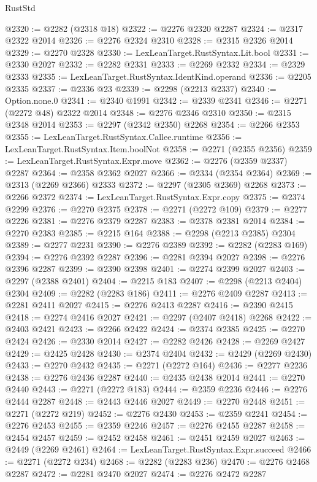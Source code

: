 \begin{lexlean}{RustStd}
\begin{coremodule}
{\begin{coremodule}
{{{{{{{{{{{{{{{{{{{{{{{{{{{{{{{{{{{{{{{{{{{{{{{{{{{{{{@2320 := @2282 (@2318 @18)
@2322 := @2276 @2320 @2287
@2324 := @2317 @2322 @2014
@2326 := @2276 @2324 @2310
@2328 := @2315 @2326 @2014
@2329 := @2270 @2328
@2330 := LexLeanTarget.RustSyntax.Lit.bool
@2331 := @2330 @2027
@2332 := @2282 @2331
@2333 := @2269 @2332
@2334 := @2329 @2333
@2335 := LexLeanTarget.RustSyntax.IdentKind.operand
@2336 := @2205 @2335
@2337 := @2336 @23
@2339 := @2298 (@2213 @2337)
@2340 := Option.none.{0}
@2341 := @2340 @1991
@2342 := @2339 @2341
@2346 := @2271 (@2272 @48) @2322 @2014
@2348 := @2276 @2346 @2310
@2350 := @2315 @2348 @2014
@2353 := @2297 (@2342 @2350) @2268
@2354 := @2266 @2353
@2355 := LexLeanTarget.RustSyntax.Callee.runtime
@2356 := LexLeanTarget.RustSyntax.Item.boolNot
@2358 := @2271 (@2355 @2356)
@2359 := LexLeanTarget.RustSyntax.Expr.move
@2362 := @2276 (@2359 @2337) @2287
@2364 := @2358 @2362 @2027
@2366 := @2334 (@2354 @2364)
@2369 := @2313 (@2269 @2366) @2333
@2372 := @2297 (@2305 @2369) @2268
@2373 := @2266 @2372
@2374 := LexLeanTarget.RustSyntax.Expr.copy
@2375 := @2374 @2299
@2376 := @2270 @2375
@2378 := @2271 (@2272 @109)
@2379 := @2277 @2226
@2381 := @2276 @2379 @2287
@2383 := @2378 @2381 @2014
@2384 := @2270 @2383
@2385 := @2215 @164
@2388 := @2298 (@2213 @2385) @2304
@2389 := @2277 @2231
@2390 := @2276 @2389
@2392 := @2282 (@2283 @169)
@2394 := @2276 @2392 @2287
@2396 := @2281 @2394 @2027
@2398 := @2276 @2396 @2287
@2399 := @2390 @2398
@2401 := @2274 @2399 @2027
@2403 := @2297 (@2388 @2401)
@2404 := @2215 @183
@2407 := @2298 (@2213 @2404) @2304
@2409 := @2282 (@2283 @186)
@2411 := @2276 @2409 @2287
@2413 := @2281 @2411 @2027
@2415 := @2276 @2413 @2287
@2416 := @2390 @2415
@2418 := @2274 @2416 @2027
@2421 := @2297 (@2407 @2418) @2268
@2422 := @2403 @2421
@2423 := @2266 @2422
@2424 := @2374 @2385
@2425 := @2270 @2424
@2426 := @2330 @2014
@2427 := @2282 @2426
@2428 := @2269 @2427
@2429 := @2425 @2428
@2430 := @2374 @2404
@2432 := @2429 (@2269 @2430)
@2433 := @2270 @2432
@2435 := @2271 (@2272 @164)
@2436 := @2277 @2236
@2438 := @2276 @2436 @2287
@2440 := @2435 @2438 @2014
@2441 := @2270 @2440
@2443 := @2271 (@2272 @183)
@2444 := @2359 @2236
@2446 := @2276 @2444 @2287
@2448 := @2443 @2446 @2027
@2449 := @2270 @2448
@2451 := @2271 (@2272 @219)
@2452 := @2276 @2430
@2453 := @2359 @2241
@2454 := @2276 @2453
@2455 := @2359 @2246
@2457 := @2276 @2455 @2287
@2458 := @2454 @2457
@2459 := @2452 @2458
@2461 := @2451 @2459 @2027
@2463 := @2449 (@2269 @2461)
@2464 := LexLeanTarget.RustSyntax.Expr.succeed
@2466 := @2271 (@2272 @234)
@2468 := @2282 (@2283 @236)
@2470 := @2276 @2468 @2287
@2472 := @2281 @2470 @2027
@2474 := @2276 @2472 @2287
}}}}}}}}}}}}}}}}}}}}}}}}}}}}}}}}}}}}}}}}}}}}}}}}}}}}}}
\end{coremodule}}
\end{coremodule}
\end{lexlean}
